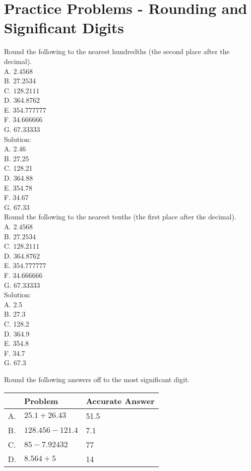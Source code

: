 \section*{Practice Problems - Rounding and Significant Digits} 
Round the following to the nearest hundredths (the second place after the decimal).\\
A. $2.4568$\\
B. $27.2534$\\
C. $128.2111$\\
D. $364.8762$\\
E. $354.777777$\\
F. $34.666666$\\
G. $67.33333$\\
\vspace{0.5cm}
Solution:\\
A. 2.46\\
B. 27.25\\
C. 128.21\\
D. 364.88\\
E. 354.78\\
F. 34.67\\
G. 67.33\\
\vspace{0.5cm}
Round the following to the nearest tenths (the first place after the decimal).\\
A. $2.4568$\\
B. $27.2534$\\
C. $128.2111$\\
D. $364.8762$\\
E. $354.777777$\\
F. $34.666666$\\
G. $67.33333$\\
\vspace{0.5cm}
Solution:\\
A. 2.5\\
B. 27.3\\
C. 128.2\\
D. 364.9\\
E. 354.8\\
F. 34.7\\
G. 67.3

\vspace{0.5cm}

Round the following answers off to the most significant digit.\\

\begin{tabular}{|l|l|l|}
\hline
 & Problem & Accurate Answer \\
\hline
A. & $25.1+26.43$ & 51.5  \\
\hline
B. & $128.456-121.4$ & 7.1  \\
\hline
C. & $85-7.92432$ & 77 \\
\hline
D. & $8.564+5$ &14  \\
\hline
\end{tabular}

